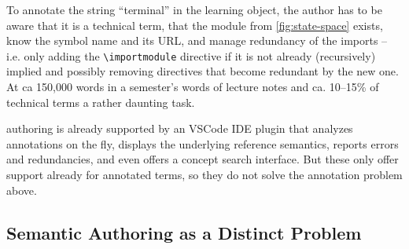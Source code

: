 \documentclass{llncs}
\begin{document}
To annotate the string ``terminal'' in the learning object, the author has to be aware
that it is a technical term, that the module from \cref{fig:state-space} exists, know the
symbol name and its URL, and manage redundancy of the imports -- i.e. only
adding the \lstinline|\importmodule| directive if it is not already (recursively) implied
and possibly removing directives that become redundant by the new one.  At ca 150,000
words in a semester's words of lecture notes and ca. 10--15\% of technical terms a rather daunting task.

\sTeX authoring is already supported by an VSCode IDE plugin \cite{sTeX-IDE:git} that
analyzes annotations on the fly, displays the underlying reference semantics, reports
errors and redundancies, and even offers a concept search interface. But these only offer
support already for annotated terms, so they do not solve the annotation problem above.

\subsection{Semantic Authoring as a Distinct Problem}
\end{document}
